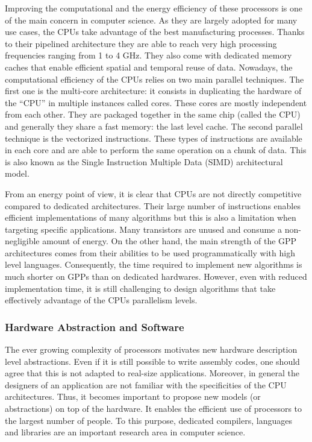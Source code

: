 Improving the computational and the energy efficiency of these processors is one
of the main concern in computer science. As they are largely adopted for many
use cases, the CPUs take advantage of the best manufacturing processes. Thanks
to their pipelined architecture they are able to reach very high processing
frequencies ranging from 1 to 4 GHz. They also come with dedicated memory caches
that enable efficient spatial and temporal reuse of data. Nowadays, the
computational efficiency of the CPUs relies on two main parallel techniques. The
first one is the multi-core architecture: it consists in duplicating the
hardware of the ``CPU'' in multiple instances called cores. These cores are
mostly independent from each other. They are packaged together in the same chip
(called the CPU) and generally they share a fast memory: the last level cache.
The second parallel technique is the vectorized instructions. These types of
instructions are available in each core and are able to perform the same
operation on a chunk of data. This is also known as the Single Instruction
Multiple Data (SIMD) architectural model.

From an energy point of view, it is clear that CPUs are not directly competitive
compared to dedicated architectures. Their large number of instructions enables
efficient implementations of many algorithms but this is also a limitation when
targeting specific applications. Many transistors are unused and consume a
non-negligible amount of energy. On the other hand, the main strength of the GPP
architectures comes from their abilities to be used programmatically with high
level languages. Consequently, the time required to implement new algorithms is
much shorter on GPPs than on dedicated hardwares. However, even with reduced
implementation time, it is still challenging to design algorithms that take
effectively advantage of the CPUs parallelism levels.

\subsubsection*{Hardware Abstraction and Software}

The ever growing complexity of processors motivates new hardware description
level abstractions. Even if it is still possible to write assembly codes, one
should agree that this is not adapted to real-size applications. Moreover, in
general the designers of an application are not familiar with the specificities
of the CPU architectures. Thus, it becomes important to propose new models (or
abstractions) on top of the hardware. It enables the efficient use of processors
to the largest number of people. To this purpose, dedicated compilers,
languages and libraries are an important research area in computer science.

